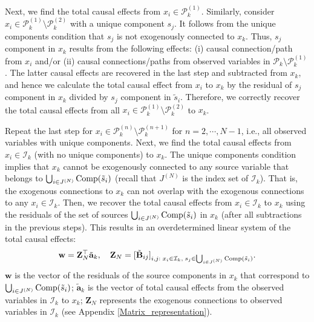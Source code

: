 \documentclass[12pt]{article}
\newcommand{\bB}{\mathbf{B}}
\begin{document}
Next, we find the total causal effects from $x_i\in\mathcal{P}_k^{(1)}$. Similarly, consider $x_i\in \mathcal{P}_k^{(1)}\setminus \mathcal{P}_k^{(2)}$ with a unique component $s_j$. It follows from the unique components condition that $s_j$ is not exogenously connected to $x_k$. Thus,  $s_j$ component in $x_k$ results from the following effects: (i) causal connection/path from $x_i$ and/or (ii) causal connections/paths from observed variables in $\mathcal{P}_k\setminus \mathcal{P}_k^{(1)}$. The latter causal effects are recovered in the last step and subtracted from $x_k$, and hence we calculate the total causal effect from $x_i$ to $x_k$ by the residual of $s_j$ component in $x_k$ divided by $s_j$ component in $\tilde{s}_i$. Therefore, we correctly recover the total causal effects from all $x_i\in \mathcal{P}_k^{(1)}\setminus \mathcal{P}_k^{(2)}$ to $x_k$.

Repeat the last step for $x_i\in \mathcal{P}_k^{(n)}\setminus \mathcal{P}_k^{(n+1)}$ for $n=2,\cdots, N-1$, i.e., all observed variables with unique components. Next, we find the total causal effects from  $x_i \in \mathcal{I}_k$ (with no unique components) to $x_k$. The unique components condition implies that $x_k$ cannot be exogenously connected to any source variable that  belongs to $\bigcup_{i\in J^{(N)}} {\rm{Comp}}(\tilde{s}_i)$ (recall that $J^{(N)}$ is the index set of $\mathcal{I}_k$). That is, the exogenous connections to $x_k$ can not overlap with the exogenous connections to any $x_i\in\mathcal{I}_k$. Then, we recover the total causal effects from $x_i\in\mathcal{I}_k$ to $x_k$ using the residuals of the set of sources $\bigcup_{i\in J^{(N)}} {\rm{Comp}}(\tilde{s}_i)$ in $x_k$ (after all subtractions in the previous steps). This results in an overdetermined linear system of the total causal effects:
\begin{align}
\label{eq:proof_sufficiency}
    \mathbf{w} = \mathbf{Z}^{\top}_N \tilde{\mathbf{a}}_k,\quad \mathbf{Z}_N = [\tilde{\bB}_{ij}]_{i,j:\;x_i\in \mathcal{I}_k,\; s_j\in \bigcup_{i\in J^{(N)}} {\rm{Comp}}(\tilde{s}_i) }.
\end{align}
$\mathbf{w}$ is the vector of the residuals of the source components in $x_k$ that correspond to $\bigcup_{i \in J^{(N)}} {\rm{Comp}}(\tilde{s}_i)$; $\tilde{\mathbf{a}}_k$ is the vector of total causal effects from the observed variables in $\mathcal{I}_k$ to $x_k$; $\mathbf{Z}_N$ represents the exogenous connections to observed variables in  $\mathcal{I}_k$ (see Appendix \ref{Matrix_representation}).
\end{document}
